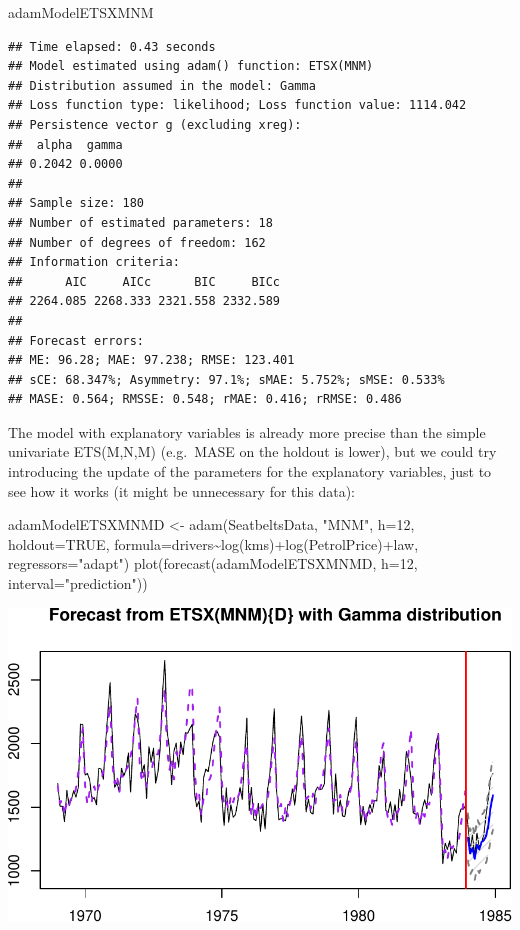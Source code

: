 \documentclass[
]{book}
\newenvironment{Shaded}{\begin{snugshade}}{\end{snugshade}}
\newcommand{\AttributeTok}[1]{\textcolor[rgb]{0.77,0.63,0.00}{#1}}
\newcommand{\ConstantTok}[1]{\textcolor[rgb]{0.00,0.00,0.00}{#1}}
\newcommand{\DecValTok}[1]{\textcolor[rgb]{0.00,0.00,0.81}{#1}}
\newcommand{\FunctionTok}[1]{\textcolor[rgb]{0.00,0.00,0.00}{#1}}
\newcommand{\NormalTok}[1]{#1}
\newcommand{\OtherTok}[1]{\textcolor[rgb]{0.56,0.35,0.01}{#1}}
\newcommand{\SpecialCharTok}[1]{\textcolor[rgb]{0.00,0.00,0.00}{#1}}
\newcommand{\StringTok}[1]{\textcolor[rgb]{0.31,0.60,0.02}{#1}}
\theoremstyle{definition}
\theoremstyle{definition}
\theoremstyle{definition}
\theoremstyle{definition}
\theoremstyle{remark}
\begin{document}
\begin{Shaded}
\begin{Highlighting}[]
\NormalTok{adamModelETSXMNM}
\end{Highlighting}
\end{Shaded}

\begin{verbatim}
## Time elapsed: 0.43 seconds
## Model estimated using adam() function: ETSX(MNM)
## Distribution assumed in the model: Gamma
## Loss function type: likelihood; Loss function value: 1114.042
## Persistence vector g (excluding xreg):
##  alpha  gamma 
## 0.2042 0.0000 
## 
## Sample size: 180
## Number of estimated parameters: 18
## Number of degrees of freedom: 162
## Information criteria:
##      AIC     AICc      BIC     BICc 
## 2264.085 2268.333 2321.558 2332.589 
## 
## Forecast errors:
## ME: 96.28; MAE: 97.238; RMSE: 123.401
## sCE: 68.347%; Asymmetry: 97.1%; sMAE: 5.752%; sMSE: 0.533%
## MASE: 0.564; RMSSE: 0.548; rMAE: 0.416; rRMSE: 0.486
\end{verbatim}

The model with explanatory variables is already more precise than the simple univariate ETS(M,N,M) (e.g.~MASE on the holdout is lower), but we could try introducing the update of the parameters for the explanatory variables, just to see how it works (it might be unnecessary for this data):

\begin{Shaded}
\begin{Highlighting}[]
\NormalTok{adamModelETSXMNMD }\OtherTok{\textless{}{-}} \FunctionTok{adam}\NormalTok{(SeatbeltsData, }\StringTok{"MNM"}\NormalTok{, }\AttributeTok{h=}\DecValTok{12}\NormalTok{, }\AttributeTok{holdout=}\ConstantTok{TRUE}\NormalTok{,}
                          \AttributeTok{formula=}\NormalTok{drivers}\SpecialCharTok{\textasciitilde{}}\FunctionTok{log}\NormalTok{(kms)}\SpecialCharTok{+}\FunctionTok{log}\NormalTok{(PetrolPrice)}\SpecialCharTok{+}\NormalTok{law,}
                          \AttributeTok{regressors=}\StringTok{"adapt"}\NormalTok{)}
\FunctionTok{plot}\NormalTok{(}\FunctionTok{forecast}\NormalTok{(adamModelETSXMNMD, }\AttributeTok{h=}\DecValTok{12}\NormalTok{, }\AttributeTok{interval=}\StringTok{"prediction"}\NormalTok{))}
\end{Highlighting}
\end{Shaded}

\includegraphics{adam_files/figure-latex/unnamed-chunk-77-1.pdf}
\end{document}
